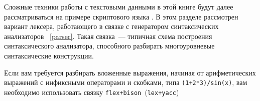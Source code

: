 
Сложные техники работы с текстовыми данными в этой книге будут далее 
рассматриваться на примере скриптового языка \bi. В этом разделе
рассмотрен вариант лексера, работающего в связке с генератором синтаксических
анализаторов \ \ref{parser}. Такая связка\ --- типичная схема
построения синтаксического анализатора, способного разбирать многоуровневые
синтаксические конструкции.

\begin{framed}
Если вам требуется разбирать вложенные выражения, начиная от арифметических
выражений с инфиксными операторами и скобками, типа \verb|(1+2*3)/sin(x)|,
вам необходимо использовать связку \verb|flex+bison|\ (\verb|lex+yacc|)   
\end{framed} 

